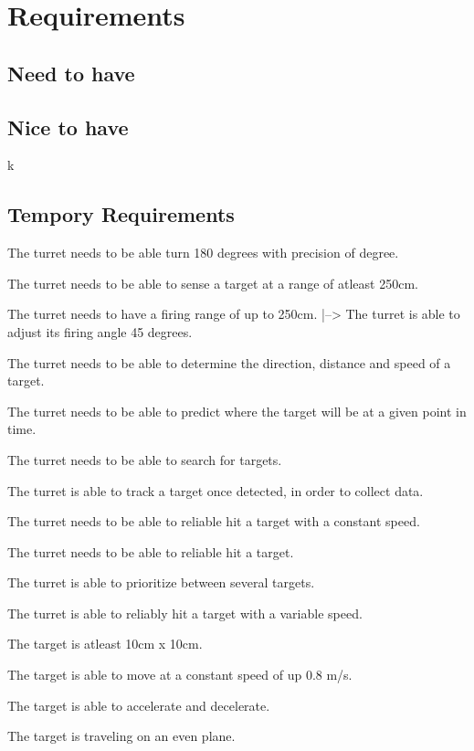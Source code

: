 \section{Requirements}

\subsection{Need to have}


\subsection{Nice to have}

k

\subsection{Tempory Requirements}
The turret needs to be able turn 180 degrees with precision of  degree.

The turret needs to be able to sense a target at a range of atleast 250cm.

The turret needs to have a firing range of up to 250cm.
|--> The turret is able to adjust its firing angle 45 degrees.

The turret needs to be able to determine the direction, distance and speed of a target.

The turret needs to be able to predict where the target will be at a given point in time.

The turret needs to be able to search for targets.

The turret is able to track a target once detected, in order to collect data.

The turret needs to be able to reliable hit a target with a constant speed.

The turret needs to be able to reliable hit 
a target.

The turret is able to prioritize between several targets.

The turret is able to reliably hit a target with a variable speed.

The target is atleast 10cm x 10cm.\nl

The target is able to move at a constant speed of up 0.8 m/s.\nl

The target is able to accelerate and decelerate.\nl

The target is traveling on an even plane.\nl
